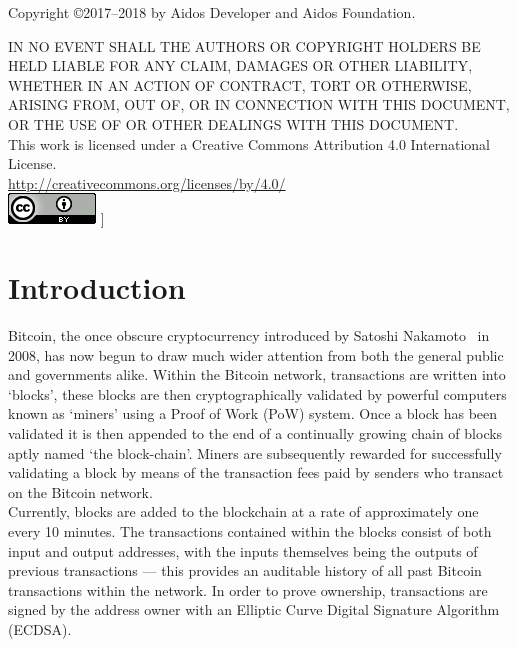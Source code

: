 \documentclass[a4paper,10pt,twocolumn]{article}
\begin{document}
			\vspace{1.5cm}
	
	\footnotesize
	Copyright \copyright  2017--2018 by Aidos Developer and Aidos Foundation.
	
	\vspace{2mm}
		
	IN NO EVENT SHALL THE AUTHORS OR COPYRIGHT HOLDERS BE HELD LIABLE FOR ANY CLAIM, DAMAGES OR OTHER
	LIABILITY, WHETHER IN AN ACTION OF CONTRACT, TORT OR OTHERWISE, ARISING FROM,
	OUT OF, OR IN CONNECTION WITH THIS DOCUMENT, OR THE USE OF OR OTHER DEALINGS WITH
	THIS DOCUMENT\@.\\
	
	This work is licensed under a Creative Commons Attribution 4.0 International License. \\
	\url{http://creativecommons.org/licenses/by/4.0/} \\
	\includegraphics{cc}
	]
	
	\normalsize
	\twocolumn[
	\tableofcontents
	\listoffigures
	]
	
	\clearpage
	
	\section{Introduction}
	Bitcoin, the once obscure cryptocurrency introduced by Satoshi Nakamoto~\cite{btc} in 2008, has now begun to draw much wider attention 
	from both the general public and governments alike. Within the Bitcoin network, transactions are written into `blocks', these blocks 
	are then cryptographically validated by powerful computers known as `miners' using a Proof of Work (PoW) system. Once a block has been 
	validated it is then appended to the end of a continually growing chain of blocks aptly named `the block-chain'. Miners are 
	subsequently rewarded for successfully validating a block by means of the transaction fees paid by senders who transact on the Bitcoin 
	network.\\
	
	Currently, blocks are added to the blockchain at a rate of approximately one every 10 minutes. The transactions contained within the
	blocks consist of both input and output addresses, with the inputs themselves being the outputs of previous transactions --- this 
	provides an auditable history of all past Bitcoin transactions within the network. In order to prove ownership, transactions are signed 
	by the address owner with an Elliptic Curve Digital Signature Algorithm (ECDSA).\\
	
\end{document}
